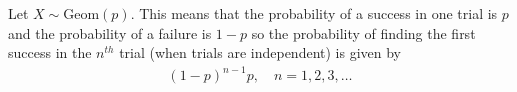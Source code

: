 





\begin{termBox}{
Let $X \sim \text{Geom}(p)$.
This means that the probability of a success in one trial is $p$ and the probability of a failure is $1-p$
so the probability of finding the first success in the $n^{th}$ trial (when trials are independent) is given by\vspace{-1.5mm}
\begin{eqnarray}
(1-p)^{n-1}p, \quad n = 1, 2, 3, \ldots	\label{massFunctionGeometric}
\end{eqnarray}
}
\end{termBox}

